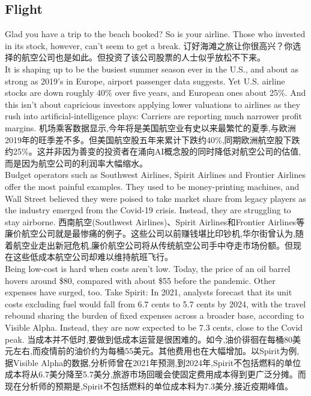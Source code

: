 \documentclass[a4paper,12pt]{article}
\begin{document}
\subsection{Flight}
Glad you have a trip to the beach booked? So is your airline. Those who invested in its stock, however, can't seem to get a break.
订好海滩之旅让你很高兴？你选择的航空公司也是如此。但投资了该公司股票的人士似乎放松不下来。
\\It is shaping up to be the busiest summer season ever in the U.S., and about as strong as 2019's in Europe, airport passenger data suggests. Yet U.S. airline stocks are down roughly 40\% over five years, and European ones about 25\%. And this isn't about capricious investors applying lower valuations to airlines as they rush into artificial-intelligence plays: Carriers are reporting much narrower profit margins.
机场乘客数据显示,今年将是美国航空业有史以来最繁忙的夏季,与欧洲2019年的旺季差不多。但美国航空股五年来累计下跌约40\%,同期欧洲航空股下跌约25\%。这并非因为善变的投资者在涌向AI概念股的同时降低对航空公司的估值,而是因为航空公司的利润率大幅缩水。
\\Budget operators such as Southwest Airlines, Spirit Airlines and Frontier Airlines offer the most painful examples. They used to be money-printing machines, and Wall Street believed they were poised to take market share from legacy players as the industry emerged from the Covid-19 crisis. Instead, they are struggling to stay airborne.
西南航空(Southwest Airlines)、Spirit Airlines和Frontier Airlines等廉价航空公司就是最惨痛的例子。这些公司以前赚钱堪比印钞机,华尔街曾认为,随着航空业走出新冠危机,廉价航空公司将从传统航空公司手中夺走市场份额。但现在这些低成本航空公司却难以维持航班飞行。
\\Being low-cost is hard when costs aren't low. Today, the price of an oil barrel hovers around \$80, compared with about \$55 before the pandemic. Other expenses have surged, too. Take Spirit: In 2021, analysts forecast that its unit costs excluding fuel would fall from 6.7 cents to 5.7 cents by 2024, with the travel rebound sharing the burden of fixed expenses across a broader base, according to Visible Alpha. Instead, they are now expected to be 7.3 cents, close to the Covid peak.
当成本并不低时,要做到低成本运营是很困难的。如今,油价徘徊在每桶80美元左右,而疫情前的油价约为每桶55美元。其他费用也在大幅增加。以Spirit为例,据Visible Alpha的数据,分析师曾在2021年预测,到2024年,Spirit不包括燃料的单位成本将从6.7美分降至5.7美分,旅游市场回暖会使固定费用成本得到更广泛分摊。而现在分析师的预期是,Spirit不包括燃料的单位成本料为7.3美分,接近疫期峰值。
\end{document}
